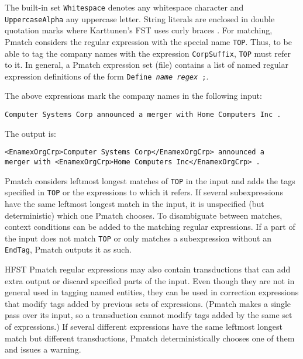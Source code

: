 \documentclass{llncs}
\begin{document}
\begin{sloppypar}
\noindent
The built-in set \texttt{Whitespace} denotes any whitespace character
and \texttt{UppercaseAlpha} any uppercase letter. String literals are
enclosed in double quotation marks where Karttunen's FST uses curly braces
\cite{karttunen/2011}.
For matching, Pmatch considers the regular expression with the special
name \texttt{TOP}. Thus, to be able to tag the company names with the
expression \texttt{CorpSuffix}, \texttt{TOP} must refer to it.
In general, a Pmatch expression set (file) contains a list of named
regular expression definitions of the form \texttt{Define
  \textit{name} \textit{regex} ;}.
\end{sloppypar}

The above expressions mark the company names in the following input:
\begin{verbatim}
Computer Systems Corp announced a merger with Home Computers Inc .
\end{verbatim}
\noindent
The output is:
\begin{verbatim}
<EnamexOrgCrp>Computer Systems Corp</EnamexOrgCrp> announced a
merger with <EnamexOrgCrp>Home Computers Inc</EnamexOrgCrp> .
\end{verbatim}

Pmatch considers leftmost longest matches of \texttt{TOP} in the input
and adds the tags specified in \texttt{TOP} or the expressions to
which it refers. If several subexpressions have the same leftmost
longest match in the input, it is unspecified (but deterministic)
which one Pmatch
chooses. To disambiguate between matches, context conditions can be
added to the matching regular expressions.
If a part of the input does not match \texttt{TOP} or only matches a
subexpression without an \texttt{EndTag},
Pmatch outputs it as such.

HFST Pmatch regular expressions may also contain transductions that can add
extra output or discard specified parts of the input. Even though they
are not in general used in tagging named entities, they can be
used in correction expressions that modify tags added by previous sets
of expressions. (Pmatch makes a single pass over its input, so a
transduction cannot modify tags added by the same set of expressions.)
If several different expressions have the same leftmost longest match
but different transductions, Pmatch deterministically chooses one of
them and issues a warning.
\end{document}
